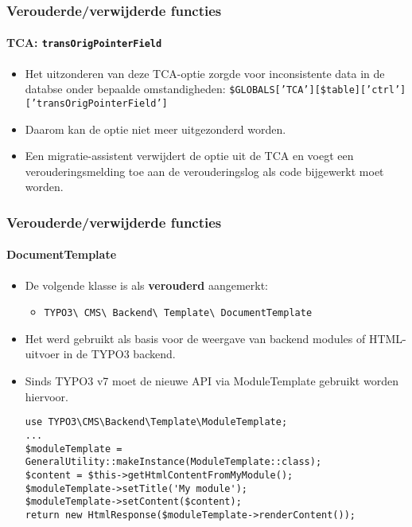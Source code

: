 \begin{frame}[fragile]
	\frametitle{Verouderde/verwijderde functies}
	\framesubtitle{TCA: \texttt{transOrigPointerField}}

	\begin{itemize}
		\item Het uitzonderen van deze TCA-optie zorgde voor inconsistente data in de databse onder bepaalde omstandigheden:
			\small
				\texttt{\$GLOBALS['TCA'][\$table]['ctrl']['transOrigPointerField']}
			\normalsize

		\item Daarom kan de optie niet meer uitgezonderd worden.
		\item Een migratie-assistent verwijdert de optie uit de TCA en voegt een verouderingsmelding
			toe aan de verouderingslog als code bijgewerkt moet worden.
	\end{itemize}

\end{frame}


\begin{frame}[fragile]
	\frametitle{Verouderde/verwijderde functies}
	\framesubtitle{DocumentTemplate}

	\lstset{basicstyle=\tiny\ttfamily}

	\begin{itemize}
		\item De volgende klasse is als \textbf{verouderd} aangemerkt:

			\begin{itemize}
				\item \texttt{TYPO3\textbackslash
					CMS\textbackslash
					Backend\textbackslash
					Template\textbackslash
					DocumentTemplate}
			\end{itemize}

		\item Het werd gebruikt als basis voor de weergave van backend modules of HTML-uitvoer in de TYPO3 backend.
		\item Sinds TYPO3 v7 moet de nieuwe API via ModuleTemplate gebruikt worden hiervoor.
\begin{lstlisting}
use TYPO3\CMS\Backend\Template\ModuleTemplate;
...
$moduleTemplate = GeneralUtility::makeInstance(ModuleTemplate::class);
$content = $this->getHtmlContentFromMyModule();
$moduleTemplate->setTitle('My module');
$moduleTemplate->setContent($content);
return new HtmlResponse($moduleTemplate->renderContent());
\end{lstlisting}

	\end{itemize}

\end{frame}

